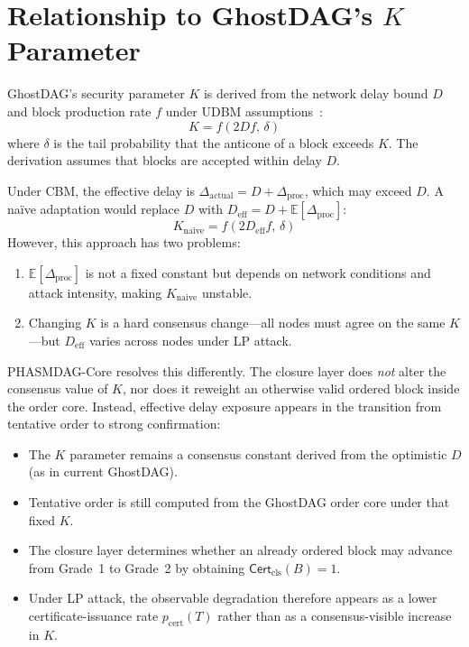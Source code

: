 \documentclass[11pt]{article}
\theoremstyle{definition}
\theoremstyle{plain}
\theoremstyle{remark}
\newcommand{\Certcls}{\mathsf{Cert}_{\mathrm{cls}}}
\begin{document}
\clearpage
\appendix
\section{Relationship to GhostDAG's \texorpdfstring{$K$}{K} Parameter}\label{app:k_param}

GhostDAG's security parameter $K$ is derived from the network delay bound $D$
and block production rate $f$ under UDBM assumptions~\cite{sompolinsky2021ghostdag}:
\begin{equation}\label{eq:k_original}
K = f(2Df,\, \delta)
\end{equation}
where $\delta$ is the tail probability that the anticone of a block exceeds
$K$.  The derivation assumes that blocks are accepted within delay $D$.

Under CBM, the effective delay is $\Delta_{\mathrm{actual}} = D + \Delta_{\mathrm{proc}}$,
which may exceed $D$.  A na\"ive adaptation would replace $D$ with
$D_{\mathrm{eff}} = D + \mathbb{E}[\Delta_{\mathrm{proc}}]$:
\begin{equation}\label{eq:k_naive}
K_{\mathrm{naive}} = f(2D_{\mathrm{eff}}f,\, \delta)
\end{equation}
However, this approach has two problems:
\begin{enumerate}[nosep]
    \item $\mathbb{E}[\Delta_{\mathrm{proc}}]$ is not a fixed constant but depends on
    network conditions and attack intensity, making $K_{\mathrm{naive}}$ unstable.
    \item Changing $K$ is a hard consensus change---all nodes must agree on the
    same $K$---but $D_{\mathrm{eff}}$ varies across nodes under LP attack.
\end{enumerate}

PHASMDAG-Core resolves this differently.  The closure layer does \emph{not} alter
the consensus value of $K$, nor does it reweight an otherwise valid ordered
block inside the order core.
Instead, effective delay exposure appears in the transition from tentative
order to strong confirmation:
\begin{itemize}[nosep]
    \item The $K$ parameter remains a consensus constant derived from the
    optimistic $D$ (as in current GhostDAG).
    \item Tentative order is still computed from the GhostDAG order core under
    that fixed $K$.
    \item The closure layer determines whether an already ordered block may
    advance from Grade~1 to Grade~2 by obtaining $\Certcls(B)=1$.
    \item Under LP attack, the observable degradation therefore appears as a
    lower certificate-issuance rate $p_{\mathrm{cert}}(T)$ rather than as a
    consensus-visible increase in $K$.
\end{itemize}
\end{document}
